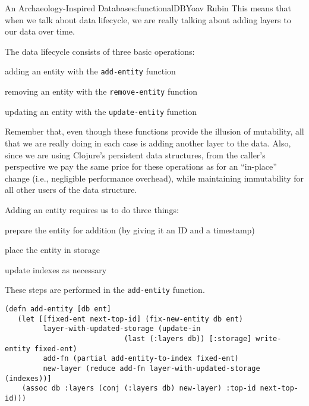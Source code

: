 \begin{aosachapter}{An Archaeology-Inspired Database}{s:functionalDB}{Yoav Rubin}
This means that when we talk about data lifecycle, we are really talking
about adding layers to our data over time.

\label{the-bare-necessities}

The data lifecycle consists of three basic operations:

\begin{aosaitemize}

\item
  adding an entity with the \texttt{add-entity} function
\item
  removing an entity with the \texttt{remove-entity} function
\item
  updating an entity with the \texttt{update-entity} function
\end{aosaitemize}

Remember that, even though these functions provide the illusion of
mutability, all that we are really doing in each case is adding another
layer to the data. Also, since we are using Clojure's persistent data
structures, from the caller's perspective we pay the same price for
these operations as for an ``in-place'' change (i.e., negligible
performance overhead), while maintaining immutability for all other
users of the data structure.

\label{adding-an-entity}

Adding an entity requires us to do three things:

\begin{aosaitemize}

\item
  prepare the entity for addition (by giving it an ID and a timestamp)
\item
  place the entity in storage
\item
  update indexes as necessary
\end{aosaitemize}

These steps are performed in the \texttt{add-entity} function.

\begin{verbatim}
(defn add-entity [db ent]
   (let [[fixed-ent next-top-id] (fix-new-entity db ent)
         layer-with-updated-storage (update-in 
                            (last (:layers db)) [:storage] write-entity fixed-ent)
         add-fn (partial add-entity-to-index fixed-ent)
         new-layer (reduce add-fn layer-with-updated-storage (indexes))]
    (assoc db :layers (conj (:layers db) new-layer) :top-id next-top-id)))
\end{verbatim}


\end{aosachapter}
